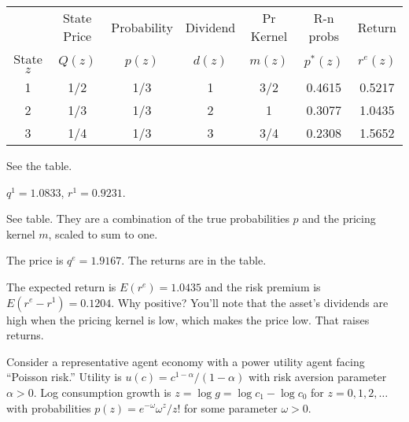 \documentclass[11pt]{exam}
\begin{document}
\begin{questions}
\begin{solution}
\vspace*{-0.2in}
\begin{center}
\begin{tabular}{ccccccc}
\toprule
        & State Price   & Probability &  Dividend & Pr Kernel & R-n probs & Return \\
State $z$  &  $Q(z)$    & $p(z)$      &   $d(z)$  &  $m(z)$   &  $p^*(z)$ & $r^e(z)$ \\
\midrule
1       & 1/2 & 1/3 & 1 & 3/2 & 0.4615 & 0.5217 \\
2       & 1/3 & 1/3 & 2 &  1  & 0.3077 & 1.0435 \\
3       & 1/4 & 1/3 & 3 &  3/4& 0.2308 & 1.5652 \\
\bottomrule
\end{tabular}
\end{center}

\begin{parts}
\item See the table.
\item $q^1 = 1.0833$, $r^1 = 0.9231$.
\item See table.  They are a combination of the true probabilities $p$
and the pricing kernel $m$, scaled to sum to one.
\item The price is $q^e = 1.9167$.  The returns are in the table.
\item The expected return is $ E(r^e) = 1.0435 $ and the risk
premium is $ E(r^e - r^1) = 0.1204$.
Why positive?  You'll note that the asset's dividends are high when the pricing kernel is low,
which makes the price low.
That raises returns.
\end{parts}
\end{solution}


Consider a representative agent economy with a power utility agent facing ``Poisson risk.''
Utility is $u(c) = c^{1-\alpha}/(1-\alpha) $ with risk aversion
parameter $\alpha > 0$.
Log consumption growth is $ z = \log g = \log c_1 - \log c_0 $
for $ z = 0,1,2, \ldots$ with probabilities
$ p(z) = e^{-\omega} \omega^z/z! $ for some parameter $\omega>0$.


\end{questions}
\end{document}
